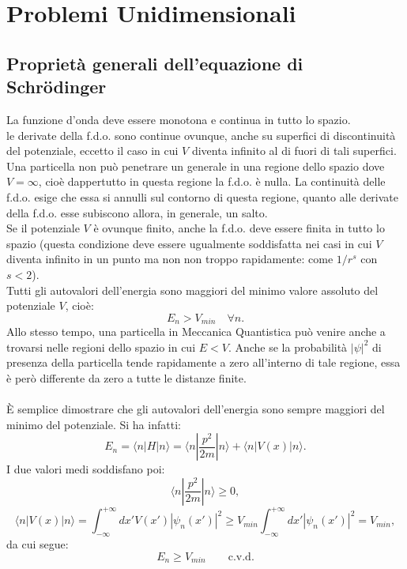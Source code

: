 \documentclass[a4paper,11pt,oneside]{book}
\begin{document}
\setcounter{chapter}{9}
\chapter{Problemi Unidimensionali}
\section{Proprietà generali dell'equazione di Schr\"{o}dinger}
La funzione d'onda deve essere monotona e continua in tutto lo spazio.\\
le derivate della f.d.o. sono continue ovunque, anche su superfici di discontinuità del potenziale, eccetto il caso in cui $V$ diventa infinito al di fuori di tali superfici.\\
Una particella non può penetrare un generale in una regione dello spazio dove $V =\infty$, cioè dappertutto in questa regione la f.d.o. è nulla. La continuità delle f.d.o. esige che essa si annulli sul contorno di questa regione, quanto alle derivate della f.d.o. esse subiscono allora, in generale, un salto.\\
Se il potenziale $V$ è ovunque finito, anche la f.d.o. deve essere finita in tutto lo spazio (questa condizione deve essere ugualmente soddisfatta nei casi in cui $V$ diventa infinito in un punto ma non non troppo rapidamente: come $1/r^s$ con $s<2$).\\
Tutti gli autovalori dell'energia sono maggiori del minimo valore assoluto del potenziale $V$, cioè:
\begin{equation}
E_n >V_{min} \quad \forall n.
\end{equation}
Allo stesso tempo, una particella in Meccanica Quantistica può venire anche a trovarsi nelle regioni dello spazio in cui $E<V$. Anche se la probabilità $|\psi|^2$ di presenza della particella tende rapidamente a zero all'interno di tale regione, essa è però differente da zero a tutte le distanze finite.\\ \\
È semplice dimostrare che gli autovalori dell'energia sono sempre maggiori del minimo del potenziale. Si ha infatti:
\begin{equation}
E_n = \langle n | H |n \rangle = \langle n | \frac{p^2}{2m} |n \rangle + \langle n | V(x) |n \rangle.
\end{equation}
I due valori medi soddisfano poi:
\begin{equation}
\langle n | \frac{p^2}{2m} |n \rangle \geq 0,
\end{equation}
\begin{equation}
\langle n | V(x) |n \rangle = \int _{-\infty} ^{+\infty} dx' V(x')|\psi _n(x')|^2 \geq V_{min} \int _{-\infty} ^{+\infty} dx' |\psi _n(x')|^2 = V_{min},
\end{equation}
da cui segue:
\begin{equation}
E_n \geq V_{min} \qquad \textrm{c.v.d.}
\end{equation}
\end{document}
